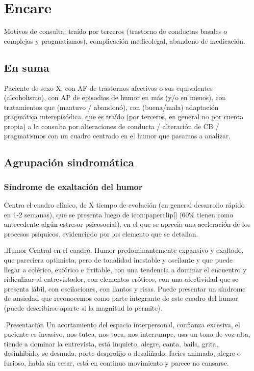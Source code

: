 \section*{Encare}
Motivos de consulta: traído por terceros (trastorno de conductas basales o complejas y pragmatismos), complicación medicolegal, abandono de medicación.
\subsection*{En suma}
Paciente de sexo X, con AF de trastornos afectivos o sus equivalentes (alcoholismo), con AP de episodios de humor en más (y/o en menos), con tratamientos que (mantuvo / abandonó), con (buena/mala) adaptación pragmática interepisódica, que es traído (por terceros, en general no por cuenta propia) a la consulta por alteraciones de conducta / alteración de CB / pragmatismos con un cuadro centrado en el humor que pasamos a analizar.
\subsection*{Agrupación sindromática}
\subsubsection*{Síndrome de exaltación del humor}
Centra el cuadro clínico, de X tiempo de evolución (en general desarrollo rápido en 1-2 semanas), que se presenta luego de icon:paperclip[] (60\% tienen como antecedente algún estresor psicosocial), en el que se aprecia una aceleración de los procesos psíquicos, evidenciado por los elemento que se detallan.

.Humor
Central en el cuadro. Humor predominantemente expansivo y exaltado, que pareciera optimista, pero de tonalidad inestable y oscilante y que puede llegar a colérico, eufórico e irritable, con una tendencia a dominar el encuentro y ridiculizar al entrevistador, con elementos eróticos, con una afectividad que se presenta lábil, con oscilaciones, con llantos y risas. Puede presentar un síndrome de ansiedad que reconocemos como parte integrante de este cuadro del humor (puede describirse aparte si la magnitud lo permite).

.Presentación
Un acortamiento del espacio interpersonal, confianza excesiva, el paciente es invasivo, nos tutea, nos toca, nos interrumpe, usa un tono de voz alta, tiende a dominar la entrevista, está inquieto, alegre, canta, baila, grita, desinhibido, se desnuda, porte desprolijo o desaliñado, facies animado, alegre o furioso, habla sin cesar, está en continuo movimiento y parece no cansarse.

